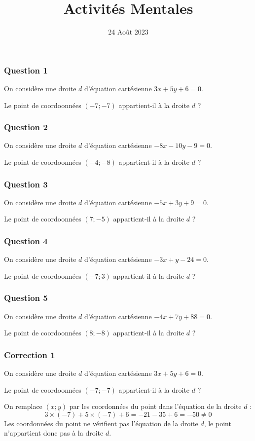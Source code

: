 \documentclass[15pt, mathserif]{beamer}
\title{Activités Mentales}
\date{24 Août 2023}
\begin{document}
\begin{frame}
    \titlepage
\end{frame}

\begin{frame} 
	\frametitle{Question 1}
On considère une droite $d$ d'équation cartésienne $3x+5y+6=0$. 
 
 Le point de coordoonnées $(-7;-7)$ appartient-il à la droite $d$ ?\end{frame}


\begin{frame} 
	\frametitle{Question 2}
On considère une droite $d$ d'équation cartésienne $-8x-10y-9=0$. 
 
 Le point de coordoonnées $(-4;-8)$ appartient-il à la droite $d$ ?\end{frame}


\begin{frame} 
	\frametitle{Question 3}
On considère une droite $d$ d'équation cartésienne $-5x+3y+9=0$. 
 
 Le point de coordoonnées $(7;-5)$ appartient-il à la droite $d$ ?\end{frame}


\begin{frame} 
	\frametitle{Question 4}
On considère une droite $d$ d'équation cartésienne $-3x+y-24=0$. 
 
 Le point de coordoonnées $(-7;3)$ appartient-il à la droite $d$ ?\end{frame}


\begin{frame} 
	\frametitle{Question 5}
On considère une droite $d$ d'équation cartésienne $-4x+7y+88=0$. 
 
 Le point de coordoonnées $(8;-8)$ appartient-il à la droite $d$ ?\end{frame}


\begin{frame}
\vspace{-10mm}
	\frametitle{Correction 1}
On considère une droite $d$ d'équation cartésienne $3x+5y+6=0$. 
 
 Le point de coordoonnées $(-7;-7)$ appartient-il à la droite $d$ ? 
 
  \bigskip 
 On remplace $(x; y)$ par les coordonnées du point dans l'équation de la droite $d$ : $$ 3\times \left(-7\right)+5\times\left(-7\right)+6= -21-35+6=-50\neq 0 $$ 
 Les coordonnées du point ne vérifient pas l'équation de la droite $d$, le point n'appartient donc pas à la droite $d$.\end{frame}
\end{document}
